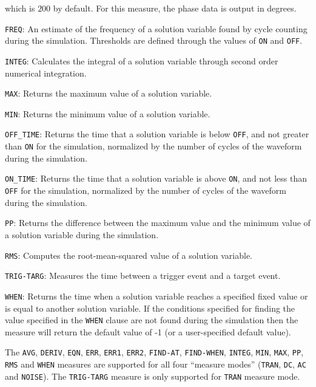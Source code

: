 \begin{XyceItemize}
    which is $200$ by default.  For this measure, the phase data is output in degrees.
  \item \texttt{FREQ}: An estimate of the frequency of a solution variable found by cycle counting
    during the simulation.  Thresholds are defined through the values of \texttt{ON} 
    and \texttt{OFF}.
  \item \texttt{INTEG}: Calculates the integral of a solution variable through second order numerical 
    integration.
  \item \texttt{MAX}: Returns the maximum value of a solution variable.
  \item \texttt{MIN}: Returns the minimum value of a solution variable.
  \item \texttt{OFF\_TIME}: Returns the time that a solution variable is below \texttt{OFF}, and not
    greater than \texttt{ON} for the simulation, normalized by the number of cycles
of the waveform during the simulation.
  \item \texttt{ON\_TIME}: Returns the time that a solution variable is above \texttt{ON}, and not
    less than \texttt{OFF} for the simulation, normalized by the number of cycles
of the waveform during the simulation.
  \item \texttt{PP}: Returns the difference between the maximum value and the minimum value of
    a solution variable during the simulation.
  \item \texttt{RMS}: Computes the root-mean-squared value of a solution variable.
  \item \texttt{TRIG-TARG}: Measures the time between a trigger event and a target event.
  \item \texttt{WHEN}: Returns the time when a solution variable reaches a specified fixed 
    value or is equal to another solution variable.  If the conditions specified for
    finding the value specified in the \texttt{WHEN} clause are not found during the simulation 
    then the measure will return the default value of -1 (or a user-specified default value).
\end{XyceItemize}

The \texttt{AVG}, \texttt{DERIV}, \texttt{EQN},   \texttt{ERR},  \texttt{ERR1}, \texttt{ERR2},
\texttt{FIND-AT}, \texttt{FIND-WHEN}, \texttt{INTEG}, \texttt{MIN}, \texttt{MAX}, \texttt{PP},
\texttt{RMS} and \texttt{WHEN} measures are supported for all four ``measure modes'' (\texttt{TRAN},
\texttt{DC}, \texttt{AC} and \texttt{NOISE}).  The \texttt{TRIG-TARG} measure is only supported for
\texttt{TRAN} measure mode.  

